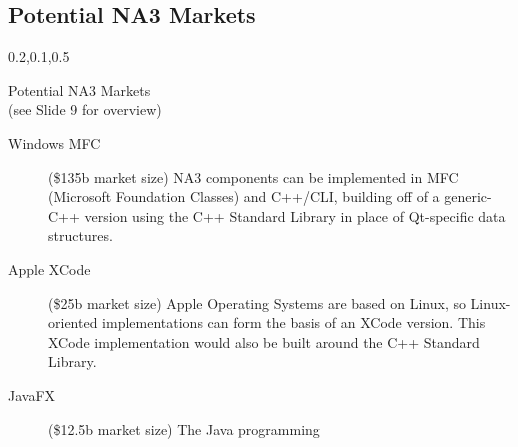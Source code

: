 
\begin{frame}{}
\section{Potential NA3 Markets}

\vspace{-3.5em}	


	
{\Large{}\selectfont
\vspace{1em}
\begin{center}
\begin{minipage}{\textwidth}
\vspace{1em}
{\begin{minipage}{\textwidth}%
\begin{lightquadblockc}{0.2,0.1,0.5}{\parbox{21cm}{\vspace*{10pt}\centering Potential NA3 Markets \\(see Slide 9 for overview)\vspace*{10pt}}}
\hspace{10pt}\begin{minipage}{1.08\textwidth}
{\LARGE {}\selectfont \setlength{\leftmargini}{3pt}\begin{description}
\item[Windows MFC] ({\texttildelow}\$135b market size) NA3 components can be implemented 
in MFC (Microsoft Foundation Classes) and C++/CLI, building off of a generic-C++ version using 
the C++ Standard Library in place of Qt-specific data structures.\vspace{10pt} 	
\item[Apple XCode] ({\texttildelow}\$25b market size) Apple Operating Systems 
are based on Linux, so Linux-oriented \AtR{}  implementations can 
form the basis of an XCode version.  This XCode implementation 
would also be built around the C++ Standard Library. \vspace{10pt}
\item[JavaFX] ({\texttildelow}\$12.5b market size)  The Java programming 

\end{description}}
\end{minipage}
\end{lightquadblockc}
\end{minipage}}
\end{minipage}
\end{center}}
\end{frame}
